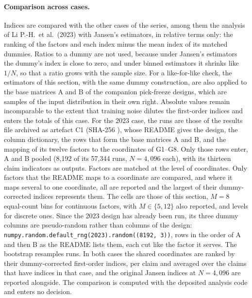 \documentclass[11pt,a4paper]{article}
\newcommand{\prop}[1]{#1}
\newcommand{\todo}[1]{\errmessage{Unfilled placeholder: #1}}
\newcommand{\prop}[1]{\textcolor{blue}{#1}}
\newcommand{\todo}[1]{\textcolor{red}{[TBD: #1]}}
\begin{document}
\paragraph{Comparison across cases.} Indices are compared with the
other cases of the series, among them the analysis of Li P.-H.\ et al.\
(2023) with Jansen's estimators, in relative terms only: the ranking of the
factors and each index minus the mean index of its matched dummies. Ratios
to a dummy are not used, because under Jansen's estimators the dummy's
index is close to zero, and under binned estimators it shrinks like $1/N$,
so that a ratio grows with the sample size. For a like-for-like check, the
estimators of this section, with the same dummy construction, are also
applied to the base matrices A and B of the companion pick-freeze designs,
which are samples of the input distribution in their own right. Absolute
values remain incomparable to the extent that training noise dilutes the
first-order indices and enters the totals of this case. \prop{For the
2023 case, the runs are those of the results file archived as artefact C1
(SHA-256 \todo{SHA-256 of the 2023 results file}), whose README gives the
design, the column dictionary, the rows that form the base matrices A and
B, and the mapping of its twelve factors to the coordinates of G1--G8.
Only those rows enter, A and B pooled (8{,}192 of its 57{,}344 runs,
$N=4{,}096$ each), with its thirteen claim indicators as outputs. Factors
are matched at the level of coordinates. Only factors that the README maps
to a coordinate are compared, and where it maps several to one coordinate,
all are reported and the largest of their dummy-corrected indices
represents them. The cells are those of this section, $M=8$ equal-count
bins for continuous factors, with $M\in\{5,12\}$ also reported, and levels
for discrete ones. Since the 2023 design has already been run, its three
dummy columns are pseudo-random rather than columns of the design:
\texttt{numpy.random.default\_rng(2023).random((8192, 3))}, rows in the
order of A and then B as the README lists them, each cut like the factor
it serves. The bootstrap resamples runs. In both cases the shared
coordinates are ranked by their dummy-corrected first-order indices, per
claim and averaged over the claims that have indices in that case, and
the original Jansen indices at $N=4{,}096$ are reported alongside. The
comparison is computed with the deposited analysis code and enters no
decision.}
\end{document}
